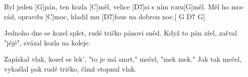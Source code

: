
\sloka
Byl jeden [G]pán, ten kozla [C]měl,
velice [D7]si s ním rozu[G]měl.
Měl ho moc rád, opravdu [C]moc,
hladil mu [D7]fous na dobrou noc.[ G D7 G]

\sloka
Jednoho dne se kozel splet,
rudé tričko pánovi sněd.
Když to pán zřel, zařval "jéjé",
svázal kozla na koleje.

\sloka
Zapískal vlak, kozel se lek’,
"to je má smrt," mečel, "mek mek."
Jak tak mečel, vykašlal pak
rudé tričko, čímž stopnul vlak.
